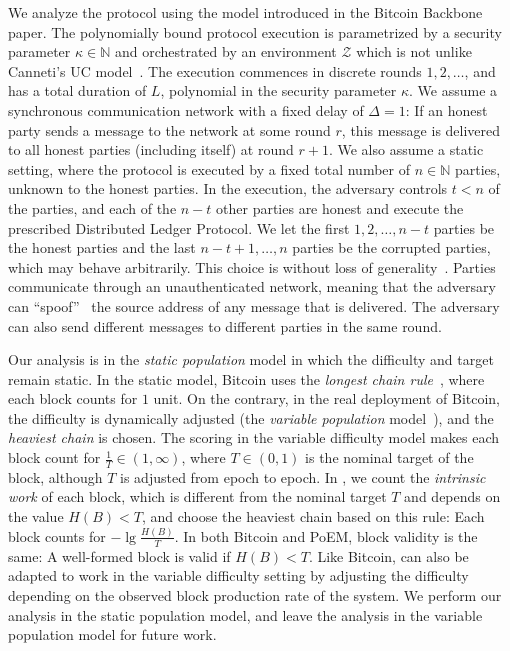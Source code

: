 \noindent
{}
We analyze the protocol using the model introduced in the Bitcoin Backbone~\cite{backbone} paper.
The polynomially bound protocol execution is parametrized by a security parameter $\kappa \in \mathbb{N}$ and
orchestrated by an environment $\mathcal{Z}$ which is not unlike Canneti's UC model~\cite{uc}. The execution commences in discrete rounds $1, 2, \ldots$, and has a total duration of
$L$, polynomial in the security parameter $\kappa$.
We assume a synchronous communication network with a fixed delay of $\Delta = 1$: If an honest party sends a message
to the network at some round $r$, this message is delivered to all honest parties
(including itself) at round $r + 1$.
We also assume a static setting, where the protocol is executed by
a fixed total number of $n \in \mathbb{N}$ parties, unknown to the honest parties.
In the execution, the adversary controls $t < n$ of the parties,
and each of the $n - t$ other parties are honest and execute the prescribed Distributed Ledger
Protocol. We let the first $1, 2, \ldots, n - t$ parties be the honest parties
and the last $n - t + 1, \ldots, n$ parties be the corrupted parties, which may behave arbitrarily.
This choice is without loss of generality~\cite[Proposition 18]{backbone}.
Parties communicate through an unauthenticated network,
meaning that the adversary can ``spoof''~\cite{douceur2002sybil}
the source address of any message that is delivered. The adversary can also send
different messages to different parties in the same round.

\noindent
{}
Our analysis is in the \emph{static population} model in which the difficulty
and target remain static. In the static model, Bitcoin uses the \emph{longest chain rule}~\cite{backbone},
where each block counts for $1$ unit.
On the contrary, in the real deployment of Bitcoin, the difficulty is dynamically adjusted (the
\emph{variable population} model~\cite{varbackbone}), and the \emph{heaviest chain} is chosen.
The scoring in the variable difficulty model makes each block count for $\frac{1}{T} \in (1, \infty)$, where
$T \in (0, 1)$ is the nominal target of the block, although $T$ is adjusted from epoch to epoch.
In \poem, we count the \emph{intrinsic work}
of each block, which is different from the nominal target $T$ and depends on the value $H(B) < T$,
and choose the heaviest chain based on this rule: Each block counts for $-\lg\frac{H(B)}{T}$.
In both Bitcoin and PoEM, block validity is the same: A well-formed block is valid if $H(B) < T$.
Like Bitcoin, \poem can also be adapted to work in the variable difficulty setting by adjusting
the difficulty depending on the observed block production rate of the system.
We perform our analysis in the static population model, and leave the analysis in the variable
population model for future work.

